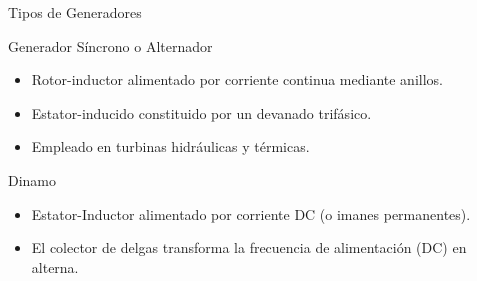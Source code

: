 \documentclass[xcolor={usenames,svgnames,dvipsnames}]{beamer}
\begin{document}
\begin{frame}[label={sec:org58dcc16}]{Tipos de Generadores}
\begin{block}{Generador Síncrono o Alternador}
\begin{itemize}
\item Rotor-inductor alimentado por corriente continua mediante anillos.

\item Estator-inducido constituido por un devanado trifásico.

\item Empleado en turbinas hidráulicas y térmicas.
\end{itemize}
\end{block}

\begin{block}{Dinamo}
\begin{itemize}
\item Estator-Inductor alimentado por corriente DC (o imanes permanentes).

\item El colector de delgas transforma la frecuencia de alimentación (DC)
en alterna.
\end{itemize}
\end{block}
\end{frame}
\end{document}
